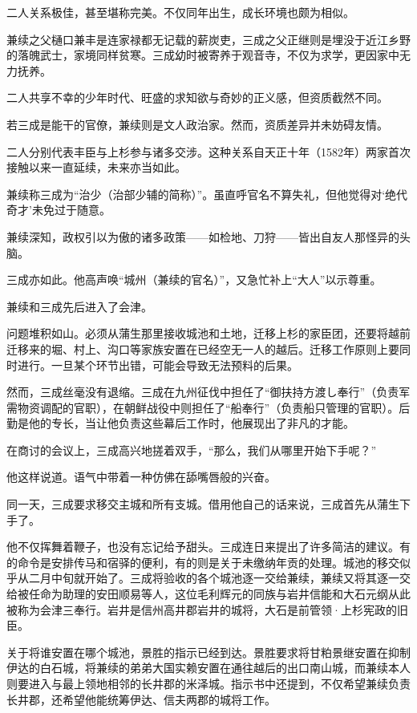 \documentclass[
]{book}
\begin{document}
二人关系极佳，甚至堪称完美。不仅同年出生，成长环境也颇为相似。

兼续之父樋口兼丰是连家禄都无记载的薪炭吏，三成之父正继则是埋没于近江乡野的落魄武士，家境同样贫寒。三成幼时被寄养于观音寺，不仅为求学，更因家中无力抚养。

二人共享不幸的少年时代、旺盛的求知欲与奇妙的正义感，但资质截然不同。

若三成是能干的官僚，兼续则是文人政治家。然而，资质差异并未妨碍友情。

二人分别代表丰臣与上杉参与诸多交涉。这种关系自天正十年（1582年）两家首次接触以来一直延续，未来亦当如此。

兼续称三成为``治少（治部少辅的简称）''。虽直呼官名不算失礼，但他觉得对`绝代奇才'未免过于随意。

兼续深知，政权引以为傲的诸多政策------如检地、刀狩------皆出自友人那怪异的头脑。

三成亦如此。他高声唤``城州（兼续的官名）''，又急忙补上``大人''以示尊重。

兼续和三成先后进入了会津。

问题堆积如山。必须从蒲生那里接收城池和土地，迁移上杉的家臣团，还要将越前迁移来的堀、村上、沟口等家族安置在已经空无一人的越后。迁移工作原则上要同时进行。一旦某个环节出错，可能会导致无法预料的后果。

然而，三成丝毫没有退缩。三成在九州征伐中担任了``御扶持方渡し奉行''（负责军需物资调配的官职），在朝鲜战役中则担任了``船奉行''（负责船只管理的官职）。后勤是他的专长，当让他负责这些幕后工作时，他展现出了非凡的才能。

在商讨的会议上，三成高兴地搓着双手，``那么，我们从哪里开始下手呢？''

他这样说道。语气中带着一种仿佛在舔嘴唇般的兴奋。

同一天，三成要求移交主城和所有支城。借用他自己的话来说，三成首先从蒲生下手了。

他不仅挥舞着鞭子，也没有忘记给予甜头。三成连日来提出了许多简洁的建议。有的命令是安排传马和宿驿的便利，有的则是关于未缴纳年贡的处理。城池的移交似乎从二月中旬就开始了。三成将验收的各个城池逐一交给兼续，兼续又将其逐一交给被任命为助理的安田顺易等人，这位毛利辉元的同族与岩井信能和大石元纲从此被称为会津三奉行。岩井是信州高井郡岩井的城将，大石是前管领·上杉宪政的旧臣。

关于将谁安置在哪个城池，景胜的指示已经到达。景胜要求将甘粕景继安置在抑制伊达的白石城，将兼续的弟弟大国实赖安置在通往越后的出口南山城，而兼续本人则要进入与最上领地相邻的长井郡的米泽城。指示书中还提到，不仅希望兼续负责长井郡，还希望他能统筹伊达、信夫两郡的城将工作。
\end{document}
